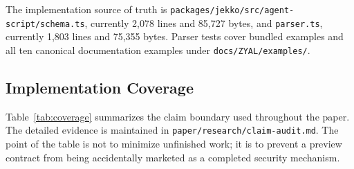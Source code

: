 \documentclass[conference]{IEEEtran}
\begin{document}
The implementation source of truth is \texttt{packages/jekko/src/agent-script/schema.ts}, currently 2,078 lines and 85,727 bytes, and \texttt{parser.ts}, currently 1,803 lines and 75,355 bytes. Parser tests cover bundled examples and all ten canonical documentation examples under \texttt{docs/ZYAL/examples/}.

\subsection{Implementation Coverage}

Table~\ref{tab:coverage} summarizes the claim boundary used throughout the paper. The detailed evidence is maintained in \texttt{paper/research/claim-audit.md}. The point of the table is not to minimize unfinished work; it is to prevent a preview contract from being accidentally marketed as a completed security mechanism.
\end{document}
